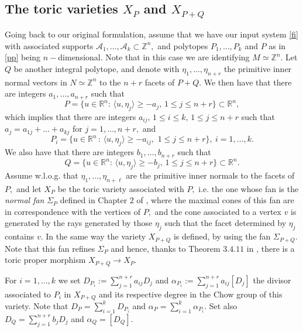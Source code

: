 \documentclass[a4paper,11pt]{amsart}
\newcommand{\R}{\mathbb{R}}
\newcommand{\Z}{\mathbb{Z}}
\newcommand{\cA}{{\mathcal A}}
\numberwithin{thm}{section}
\numberwithin{equation}{section}
\theoremstyle{definition}
\theoremstyle{plain}
\begin{document}
\subsection{The toric varieties $X_P$ and $X_{P+Q}$}\label{2.2}
Going back to our original formulation, assume that we have our input system \eqref{fi} with  associated supports $\cA_1,\ldots, \cA_k\subset\Z^n,$ and  polytopes $P_1,\ldots, P_k$ and $P$ as in \eqref{pp} being $n-$dimensional. Note that in this case we are identifying $M\simeq\Z^n.$ Let $Q$ be another integral polytope, and
denote with $\eta_1,\ldots, \eta_{n+r}$ the primitive inner normal vectors in $N\simeq\Z^n$ to the $n+r$ facets of $P+Q$. We then have  that there are integers $a_1,\ldots, a_{n+r}$ such that
\begin{equation}\label{P}
P=\{u\in\R^n:\, \langle u,\eta_j\rangle\geq-a_j,\, 1\leq j\leq n+r\}\subset\R^n,
\end{equation}
which implies that there are integers $a_{ij},\,1\leq i\leq k,\,1\leq j\leq n+r$ such that $a_j=a_{1j}+\ldots+a_{kj}$ for $j=1,\ldots, n+r,$  and
\begin{equation}\label{PPi}
P_i =\{u \in \R^n\, : \, \langle u,\eta_j \rangle \ge - a_{ij},\,\, 1\leq j\leq n+r\},\ i=1,\ldots, k.
\end{equation}
We also have that there are integers $b_1,\ldots, b_{n+r}$ such that
\begin{equation}\label{Q}
Q=\{u\in\R^n:\, \langle u,\eta_j\rangle\geq-b_j,\, 1\leq j\leq n+r\}\subset\R^n.
\end{equation}
Assume w.l.o.g. that $\eta_1,\ldots, \eta_{n+\ell}$ are the primitive inner normals to the facets of $P,$ and let $X_P$ be the toric variety associated with $P,$ i.e. the one  whose fan is the \textit{normal fan} $\Sigma_P$  defined in Chapter $2$ of \cite{CLS11}, where the maximal cones of this fan are in correspondence with the vertices of $P,$ and the cone associated to a vertex $v$ is generated by the rays generated by those $\eta_j$ such that the facet determined by $\eta_j$ contains $v$. In the same way the variety $X_{P+Q}$ is defined, by using the fan $\Sigma_{P+Q}$. Note that this fan refines $\Sigma_P$ and hence, thanks to Theorem $3.4.11$ in \cite{CLS11},  there is a toric proper morphism $X_{P+Q}\to X_P.$


For $i=1,\ldots, k$ we set $D_{P_i}:=\sum_{j=1}^{n+r}a_{ij}D_j$ and $\alpha_{P_i}:=\sum_{j=1}^{n+r} a_{ij}[D_j]$ the divisor associated to $P_i$ in $X_{P+Q}$ and its respective degree in the Chow group of this variety. Note that
$D_P=\sum_{i=1}^k D_{P_i}$ and $\alpha_P=\sum_{i=1}^k \alpha_{P_i}.$ Set also $D_Q=\sum_{j=1}^{n+r} b_j D_j$ and $\alpha_Q=[D_Q].$
\end{document}
